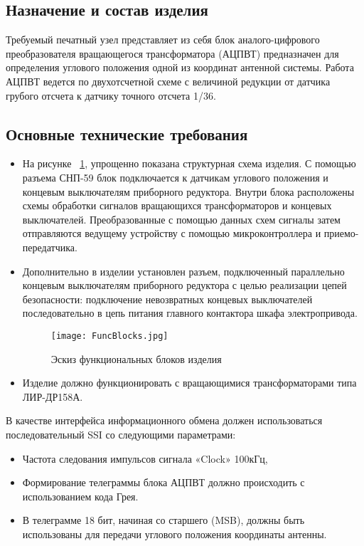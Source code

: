 \subsection{Назначение и состав изделия}
Требуемый печатный узел представляет из себя блок аналого-цифрового преобразователя вращающегося трансформатора (АЦПВТ) предназначен для определения углового положения 
одной из координат антенной системы. 
Работа АЦПВТ ведется по двухотсчетной схеме с величиной редукции от датчика грубого отсчета к датчику точного отсчета 1/36.  

\subsection{Основные технические требования}
\begin{itemize}
    \item На рисунке ~\ref{FuncBlocks}, упрощенно показана структурная схема изделия. 
          С помощью разъема СНП-59 блок подключается к датчикам углового положения и концевым выключателям приборного редуктора. 
          Внутри блока расположены схемы обработки сигналов вращающихся трансформаторов и концевых выключателей. 
          Преобразованные с помощью данных схем сигналы затем отправляются ведущему устройству с помощью микроконтроллера и приемо-передатчика.  

    \item Дополнительно в изделии установлен разъем, подключенный параллельно концевым выключателям приборного редуктора с целью реализации цепей безопасности: 
          подключение невозвратных концевых выключателей последовательно в цепь питания главного контактора шкафа электропривода. 

        \begin{figure}[!t]
          \centering
          \texttt{[image: FuncBlocks.jpg]} 
          \caption{Эскиз функциональных блоков изделия}
          \label{FuncBlocks}
        \end{figure}

    \item Изделие должно функционировать с вращающимися трансформаторами типа ЛИР-ДР158А.
      \end{itemize}


    В качестве интерфейса информационного обмена должен использоваться последовательный SSI со следующими параметрами:
    \begin{itemize}
          \item Частота следования импульсов сигнала «Clock» 100кГц,
          \item Формирование телеграммы блока АЦПВТ должно происходить с использованием кода Грея. 
          \item В телеграмме 18 бит, начиная со старшего (MSB), должны быть использованы для передачи углового положения координаты антенны. 
    \end{itemize}

